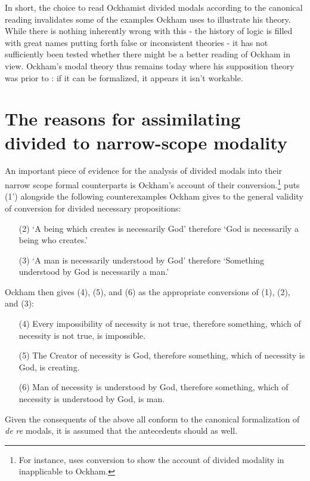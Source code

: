 \documentclass[a4paper]{article}
\begin{document}
In short, the choice to read Ockhamist divided modals according to the canonical reading invalidates some of the examples Ockham uses to illustrate his theory. While there is nothing inherently wrong with this - the history of logic is filled with great names putting forth false or inconsistent theories - it has not sufficiently been tested whether there might be a better reading of Ockham in view. Ockham's modal theory thus remains today where his supposition theory was prior to \cite{PriestRead1977}: if it can be formalized, it appears it isn't workable.

\section{The reasons for assimilating divided to narrow-scope modality}
An important piece of evidence for the analysis of divided modals into their narrow scope formal counterparts is Ockham's account of their conversion.\footnote{For instance, \cite[p. 276]{PriestRead1981} uses conversion to show the account of divided modality in \cite[sec. 12]{Moody1952} inapplicable to Ockham.} \cite[p. 242]{Johnston2015} puts (1') alongside the following counterexamples Ockham gives to the general validity of conversion for divided necessary propositions:
\begin{enumerate}
	\item[(2)]	`A being which creates is necessarily God' therefore `God is necessarily a being who creates.' 
	\item[(3)]	`A man is necessarily understood by God' therefore `Something understood by God is necessarily a man.' \cite[II. 24, p. 298]{OckhamSL2}
\end{enumerate}

Ockham then gives (4), (5), and (6) as the appropriate conversions of (1), (2), and (3):

\begin{enumerate}
\item[(4)]	Every impossibility of necessity is not true, therefore something, which of necessity is not true, is impossible.
\item[(5)]	The Creator of necessity is God, therefore something, which of necessity is God, is creating.
\item[(6)]	Man of necessity is understood by God, therefore something, which of necessity is understood by God, is man. \cite[II. 24, p. 298]{OckhamSL2}
\end{enumerate}

Given the consequents of the above all conform to the canonical formalization of \textit{de re} modals, it is assumed that the antecedents should as well.
\end{document}
